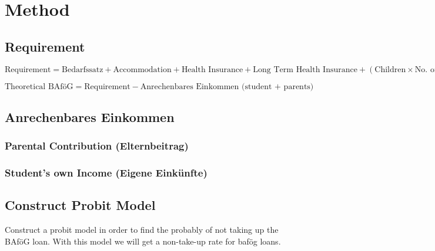 \section{Method}

\subsection{Requirement}
\begin{equation}
  \text{Requirement} = \text{Bedarfssatz} + \text{Accommodation} + \text{Health Insurance} + \text{Long Term Health Insurance} + (\text{Children} \times \text{No. of Children} )
\end{equation}

\begin{equation}
  \text{Theoretical BAföG} = \text{Requirement} - \text{Anrechenbares Einkommen (student + parents)}
\end{equation}

\subsection{Anrechenbares Einkommen}
\subsubsection{Parental Contribution (Elternbeitrag)}
\subsubsection{Student's own Income (Eigene Einkünfte)}


\subsection{Construct Probit Model}
Construct a probit model in order to find the probably of not taking up the BAföG loan. 
With this model we will get a non-take-up rate for bafög loans.
















